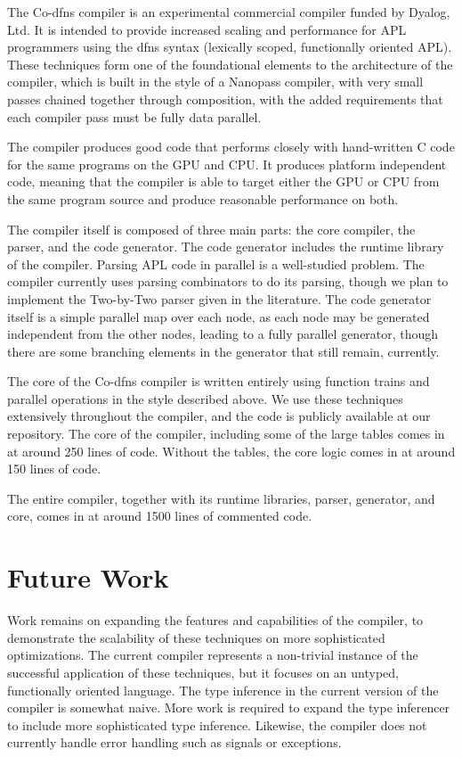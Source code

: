 \documentclass[numbers,preprint]{sigplanconf}
\begin{document}
The Co-dfns compiler is an experimental commercial compiler funded by 
Dyalog, Ltd. It is intended to provide increased scaling and performance
for APL programmers using the dfns syntax (lexically scoped, functionally 
oriented APL). These techniques form one of the foundational elements to 
the architecture of the compiler, which is built in the style of a Nanopass 
compiler, with very small passes chained together through composition, with 
the added requirements that each compiler pass must be fully data parallel. 

The compiler produces good code that performs closely with hand-written 
C code for the same programs on the GPU and CPU. It produces platform 
independent code, meaning that the compiler is able to target either the 
GPU or CPU from the same program source and produce reasonable performance 
on both. 

The compiler itself is composed of three main parts: the core compiler, 
the parser, and the code generator. The code generator includes the runtime 
library of the compiler. Parsing APL code in parallel is a well-studied 
problem. The compiler currently uses parsing combinators to do its parsing, 
though we plan to implement the Two-by-Two parser given in the literature. 
The code generator itself is a simple parallel map over each node, as 
each node may be generated independent from the other nodes, leading to a 
fully parallel generator, though there are some branching elements in the 
generator that still remain, currently. 

The core of the Co-dfns compiler is written entirely using function trains 
and parallel operations in the style described above. We use these techniques 
extensively throughout the compiler, and the code is publicly available 
at our repository. The core of the compiler, including some of the large 
tables comes in at around 250 lines of code. Without the tables, the core 
logic comes in at around 150 lines of code. 

The entire compiler, together with its runtime libraries, parser, generator, 
and core, comes in at around 1500 lines of commented code. 

\section{Future Work}

Work remains on expanding the features and capabilities of the compiler, 
to demonstrate the scalability of these techniques on more sophisticated 
optimizations. The current compiler represents a non-trivial instance of 
the successful application of these techniques, but it focuses on an untyped, 
functionally oriented language. The type inference in the current version 
of the compiler is somewhat naive. More work is required to expand the 
type inferencer to include more sophisticated type inference. Likewise, 
the compiler does not currently handle error handling such as signals or 
exceptions. 
\end{document}
